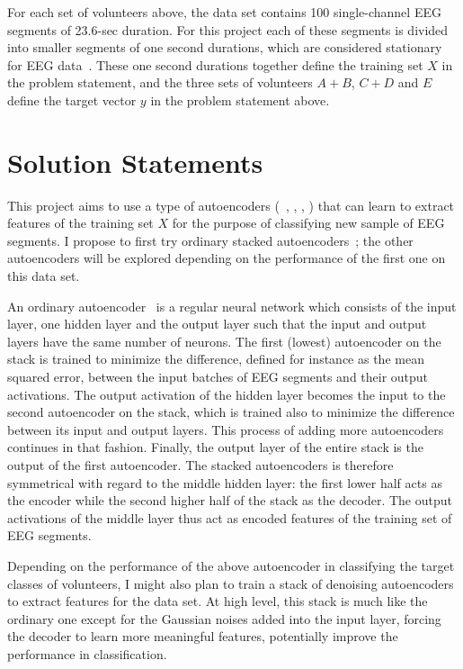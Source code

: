 \documentclass[12pt]{article}
\begin{document}
For each set of volunteers above, the data set contains 100 single-channel EEG segments of 23.6-sec duration. For this project each of these segments is divided into smaller segments of one second durations, which are considered stationary for EEG data~\cite{nigam2004neural}. These one second durations together define the training set $X$ in the problem statement, and the three sets of volunteers $A + B$, $C + D$ and $E$ define the target vector $y$ in the problem statement above.

\section{Solution Statements}
\label{sec:solution}

This project aims to use a type of autoencoders (~\cite{bengio2007greedy}, \cite{vincent2010stacked}, \cite{boureau2008sparse}, \cite{kingma2013auto}) that can learn to extract features of the training set $X$ for the purpose of classifying new sample of EEG segments. I propose to first try ordinary stacked autoencoders~\cite{bengio2007greedy}; the other autoencoders will be explored depending on the performance of the first one on this data set.

An ordinary autoencoder~\cite{bengio2007greedy} is a regular neural network which consists of the input layer, one hidden layer and the output layer such that the input and output layers have the same number of neurons. The first (lowest) autoencoder on the stack is trained to minimize the difference, defined for instance as the mean squared error, between the input batches of EEG segments and their output activations. The output activation of the hidden layer becomes the input to the second autoencoder on the stack, which is trained also to minimize the difference between its input and output layers. This process of adding more autoencoders continues in that fashion. Finally, the output layer of the entire stack is the output of the first autoencoder. The stacked autoencoders is therefore symmetrical with regard to the middle hidden layer: the first lower half acts as the encoder while the second higher half of the stack as the decoder. The output activations of the middle layer thus act as encoded features of the training set of EEG segments.

Depending on the performance of the above autoencoder in classifying the target classes of volunteers, I might also plan to train a stack of denoising autoencoders~\cite{vincent2010stacked} to extract features for the data set. At high level, this stack is much like the ordinary one except for the Gaussian noises added into the input layer, forcing the decoder to learn more meaningful features, potentially improve the performance in classification.
\end{document}
